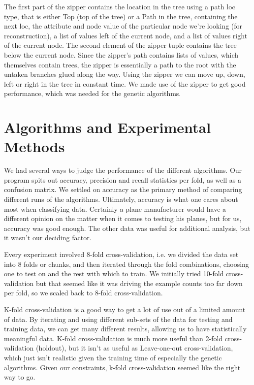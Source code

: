 \documentclass[12pt, letterpaper]{article}
\begin{document}
The first part of the zipper contains the location in the tree using a path loc type, that is either Top (top of the tree) or a Path in the tree, containing the next loc, the attribute and node value of the particular node we're looking (for reconstruction), a list of values left of the current node, and a list of values right of the current node. The second element of the zipper tuple contains the tree below the current node. Since the zipper's path contains lists of values, which themselves contain trees, the zipper is essentially a path to the root with the untaken branches glued along the way.  Using the zipper we can move up, down, left or right in the tree in constant time. We made use of the zipper to get good performance, which was needed for the genetic algorithms.


\section{Algorithms and Experimental Methods}

We had several ways to judge the performance of the different algorithms. Our program spits out accuracy, precision and recall statistics per fold, as well as a confusion matrix. We settled on accuracy as the primary method of comparing different runs of the algorithms. Ultimately, accuracy is what one cares about most when classifying data. Certainly a plane manufacturer would have a different opinion on the matter when it comes to testing his planes, but for us, accuracy was good enough. The other data was useful for additional analysis, but it wasn't our deciding factor. 

Every experiment involved 8-fold cross-validation, i.e. we divided the data set into 8 folds or chunks, and then iterated through the fold combinations, choosing one to test on and the rest with which to train. We initially tried 10-fold cross-validation but that seemed like it was driving the example counts too far down per fold, so we scaled back to 8-fold cross-validation.

K-fold cross-validation is a good way to get a lot of use out of a limited amount of data. By iterating and using different sub-sets of the data for testing and training data, we can get many different results, allowing us to have statistically meaningful data. K-fold cross-validation is much more useful than 2-fold cross-validation (holdout), but it isn't as useful as Leave-one-out cross-validation, which just isn't realistic given the training time of especially the genetic algorithms. Given our constraints, k-fold cross-validation seemed like the right way to go.
\end{document}

